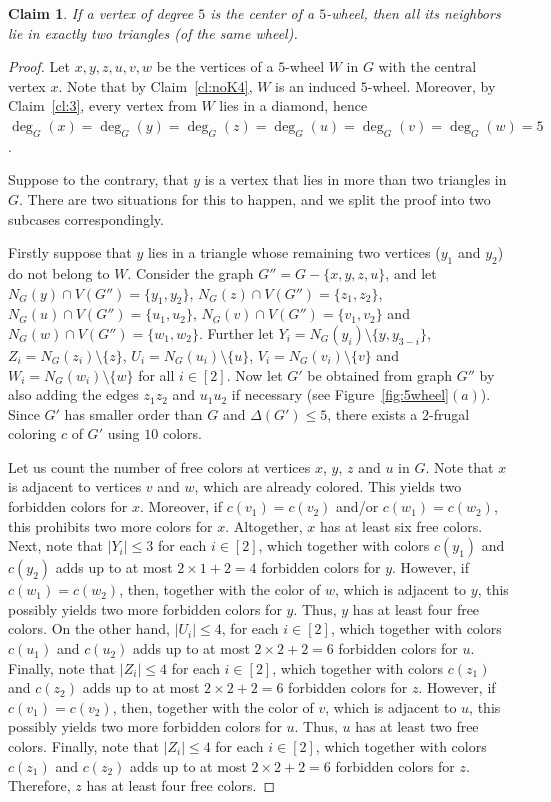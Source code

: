 \documentclass[11pt]{article}
\newtheorem{claim}{Claim}
\begin{document}
\begin{claim} If a vertex of degree $5$ is the center of a $5$-wheel, then all its neighbors lie in  exactly two triangles (of the same wheel).
\label{cl:8}
\end{claim} 
\begin{proof}
Let $x,y,z,u,v,w$ be the vertices of a $5$-wheel $W$ in $G$ with the central vertex $x$. 
Note that by Claim~\ref{cl:noK4}, $W$ is an induced $5$-wheel. Moreover, by Claim~\ref{cl:3}, every vertex from $W$ lies in a diamond, hence $\deg_G(x)=\deg_G(y)=\deg_G(z)=\deg_G(u)=\deg_G(v)=\deg_G(w)=5$. 

Suppose to the contrary, that $y$ is a vertex that lies in more than two triangles in $G$. There are two situations for this to happen, and we split the proof into two subcases correspondingly.

Firstly suppose that $y$ lies in a triangle whose remaining two vertices ($y_1$ and $y_2$) do not belong to $W$. Consider the graph $G''=G-\{x,y,z,u\}$, and let $N_G(y) \cap V(G'')=\{y_1,y_2\}$, $N_G(z) \cap V(G'')=\{z_1,z_2\}$, $N_G(u) \cap V(G'')=\{u_1,u_2\}$, $N_G(v) \cap V(G'')=\{v_1,v_2\}$ and $N_G(w) \cap V(G'')=\{w_1,w_2\}$. Further let $Y_i=N_G(y_i)\setminus\{y,y_{3-i}\}$, $Z_i=N_G(z_i)\setminus\{z\}$, $U_i=N_G(u_i)\setminus\{u\}$, $V_i=N_G(v_i)\setminus\{v\}$ and $W_i=N_G(w_i)\setminus\{w\}$ for all $i \in [2]$. %
Now let $G'$ be obtained from graph $G''$ by also adding the edges $z_1z_2$ and $u_1u_2$ if necessary (see Figure~\ref{fig:5wheel}$(a)$). Since $G'$ has smaller order than $G$ and $\Delta(G') \le 5$, there exists a $2$-frugal coloring $c$ of $G'$ using $10$ colors. 

Let us count the number of free colors at vertices $x$, $y$, $z$ and $u$ in $G$. Note that $x$ is adjacent to vertices $v$ and $w$, which are already colored. This yields two forbidden colors for $x$. Moreover, if $c(v_1)=c(v_2)$ and/or $c(w_1)=c(w_2)$, this prohibits two more colors for $x$. Altogether, $x$ has at least six free colors. Next, note that $|Y_i| \le 3$ for each $i\in [2]$, which together with colors $c(y_1)$ and $c(y_2)$ adds up to at most $2 \times 1 + 2=4$ forbidden colors for $y$. However, if $c(w_1)=c(w_2)$, then, together with the color of $w$, which is adjacent to $y$, this possibly yields two more forbidden colors for $y$. Thus, $y$ has at least four free colors. On the other hand, $|U_i|\le 4$, for each $i\in [2]$, which together with colors $c(u_1)$ and $c(u_2)$ adds up to at most $2 \times 2 + 2=6$ forbidden colors for $u$.
Finally, note that $|Z_i| \le 4$ for each $i\in [2]$, which together with colors $c(z_1)$ and $c(z_2)$ adds up to at most $2 \times 2 + 2=6$ forbidden colors for $z$. 
However, if $c(v_1)=c(v_2)$, then, together with the color of $v$, which is adjacent to $u$, this possibly yields two more forbidden colors for $u$. Thus, $u$ has at least two free colors. Finally, note that $|Z_i| \le 4$ for each $i\in [2]$, which together with colors $c(z_1)$ and $c(z_2)$ adds up to at most $2 \times 2 + 2=6$ forbidden colors for $z$. Therefore, $z$ has at least four free colors. 


\end{proof}
\end{document}
